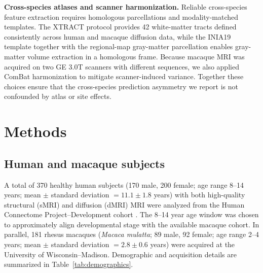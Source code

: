 \documentclass[11pt]{article}
\begin{document}
\textbf{Cross-species atlases and scanner harmonization.} Reliable cross-species feature extraction requires homologous parcellations and modality-matched templates. The XTRACT protocol \citep{warrington2020xtract} provides 42 white-matter tracts defined consistently across human and macaque diffusion data, while the INIA19 template \citep{rohlfing2012inia19} together with the regional-map gray-matter parcellation \citep{bezgin2012hierarchical} enables gray-matter volume extraction in a homologous frame. Because macaque MRI was acquired on two GE 3.0T scanners with different sequences, we also applied ComBat harmonization \citep{johnson2007adjusting, fortin2017harmonization_dti, fortin2017harmonization_thickness} to mitigate scanner-induced variance. Together these choices ensure that the cross-species prediction asymmetry we report is not confounded by atlas or site effects.

\section{Methods}

\subsection{Human and macaque subjects}

A total of 370 healthy human subjects (170 male, 200 female; age range 8--14 years; mean $\pm$ standard deviation $= 11.1 \pm 1.8$ years) with both high-quality structural (sMRI) and diffusion (dMRI) MRI were analyzed from the Human Connectome Project--Development cohort \citep{somerville2018lifespan, harms2018extending}. The 8--14 year age window was chosen to approximately align developmental stage with the available macaque cohort. In parallel, 181 rhesus macaques (\textit{Macaca mulatta}; 89 male, 92 female; age range 2--4 years; mean $\pm$ standard deviation $= 2.8 \pm 0.6$ years) were acquired at the University of Wisconsin--Madison. Demographic and acquisition details are summarized in Table~\ref{tab:demographics}.
\end{document}
